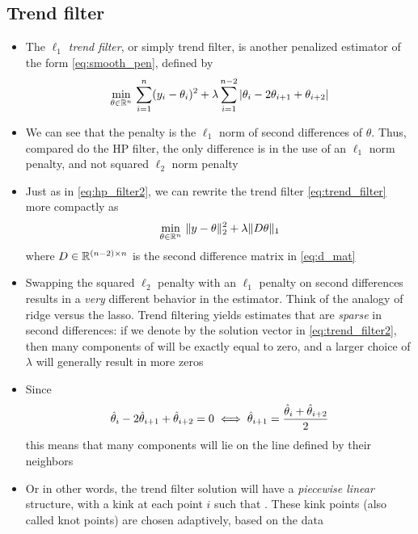 \documentclass{article}
\begin{document}
\subsection{Trend filter}

\begin{itemize}
\item The \emph{$\ell_1$ trend filter}, or simply trend filter, is another
  penalized estimator of the form \eqref{eq:smooth_pen}, defined by     
  \begin{equation}
  \label{eq:trend_filter} 
  \min_{\theta \in \mathbb{R}^n} \, \sum_{i=1}^n (y_i - \theta_i)^2 + \lambda
  \sum_{i=1}^{n-2} |\theta_i - 2\theta_{i+1} + \theta_{i+2}|
  \end{equation}

\item We can see that the penalty is the $\ell_1$ norm of second differences of
  $\theta$. Thus, compared do the HP filter, the only difference is in the use
  of an $\ell_1$ norm penalty, and not squared $\ell_2$ norm penalty

\item Just as in \eqref{eq:hp_filter2}, we can rewrite the trend filter
  \eqref{eq:trend_filter} more compactly as
  \begin{equation}
  \label{eq:trend_filter2}
  \min_{\theta \in \mathbb{R}^n} \, \|y - \theta\|_2^2 + \lambda \|D \theta\|_1 
  \end{equation}
  where $D \in \mathbb{R}^{(n-2) \times n}$ is the second difference matrix in
  \eqref{eq:d_mat} 

\item Swapping the squared $\ell_2$ penalty with an $\ell_1$ penalty on second
  differences results in a \emph{very} different behavior in the estimator. 
  Think of the analogy of ridge versus the lasso. Trend filtering yields
  estimates that are \emph{sparse} in second differences: if we denote by
  \smash{$\htheta$} the solution vector in \eqref{eq:trend_filter2}, then many
  components of  will be exactly equal to zero, and a larger
  choice of $\lambda$ will generally result in more zeros 

\item Since 
  \[
  \hat{\theta}_i - 2\hat{\theta}_{i+1} + \hat{\theta}_{i+2} = 0 \iff  
  \hat{\theta}_{i+1} = \frac{\hat{\theta}_i + \hat{\theta}_{i+2}}{2} 
  \]
  this means that many components  will lie on the line
  defined by their neighbors

\item Or in other words, the trend filter solution \smash{$\htheta$} will have a
  \emph{piecewise linear} structure, with a kink at each point $i$ such that
  . These kink points
  (also called knot points) are chosen adaptively, based on the data


\end{itemize}
\end{document}
